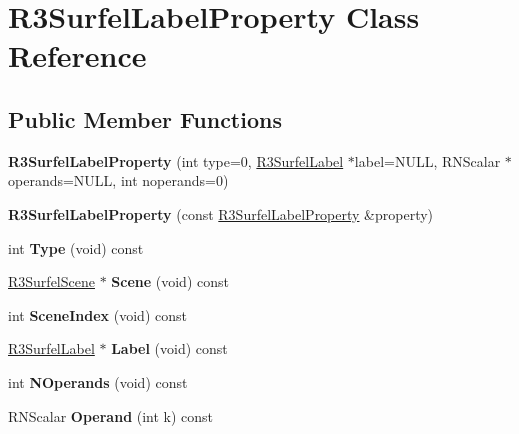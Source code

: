 \hypertarget{class_r3_surfel_label_property}{}\section{R3\+Surfel\+Label\+Property Class Reference}
\label{class_r3_surfel_label_property}
\subsection*{Public Member Functions}
\begin{DoxyCompactItemize}
\item 
{\bfseries R3\+Surfel\+Label\+Property} (int type=0, \hyperlink{class_r3_surfel_label}{R3\+Surfel\+Label} $\ast$label=N\+U\+LL, R\+N\+Scalar $\ast$operands=N\+U\+LL, int noperands=0)\hypertarget{class_r3_surfel_label_property_a686f20345d54be06a916b05f14f4586c}{}\label{class_r3_surfel_label_property_a686f20345d54be06a916b05f14f4586c}

\item 
{\bfseries R3\+Surfel\+Label\+Property} (const \hyperlink{class_r3_surfel_label_property}{R3\+Surfel\+Label\+Property} \&property)\hypertarget{class_r3_surfel_label_property_abc90d633ddd410fbdcc8ffcfe7774fdd}{}\label{class_r3_surfel_label_property_abc90d633ddd410fbdcc8ffcfe7774fdd}

\item 
int {\bfseries Type} (void) const \hypertarget{class_r3_surfel_label_property_a117d2cd83e7c1e54b38443adf257d509}{}\label{class_r3_surfel_label_property_a117d2cd83e7c1e54b38443adf257d509}

\item 
\hyperlink{class_r3_surfel_scene}{R3\+Surfel\+Scene} $\ast$ {\bfseries Scene} (void) const \hypertarget{class_r3_surfel_label_property_a9a99f21e18ee9c064dfd0f2a224f081a}{}\label{class_r3_surfel_label_property_a9a99f21e18ee9c064dfd0f2a224f081a}

\item 
int {\bfseries Scene\+Index} (void) const \hypertarget{class_r3_surfel_label_property_a52c4c1f762f8b6aab886d5fad9add2f5}{}\label{class_r3_surfel_label_property_a52c4c1f762f8b6aab886d5fad9add2f5}

\item 
\hyperlink{class_r3_surfel_label}{R3\+Surfel\+Label} $\ast$ {\bfseries Label} (void) const \hypertarget{class_r3_surfel_label_property_acbb6cf829bdc3ba8185223deeb0380b3}{}\label{class_r3_surfel_label_property_acbb6cf829bdc3ba8185223deeb0380b3}

\item 
int {\bfseries N\+Operands} (void) const \hypertarget{class_r3_surfel_label_property_afe49ee3643a307edac3c1d56b5e30c5f}{}\label{class_r3_surfel_label_property_afe49ee3643a307edac3c1d56b5e30c5f}

\item 
R\+N\+Scalar {\bfseries Operand} (int k) const \hypertarget{class_r3_surfel_label_property_adf7fd3c411daed82c9d40792575fea74}{}\label{class_r3_surfel_label_property_adf7fd3c411daed82c9d40792575fea74}

\end{DoxyCompactItemize}

